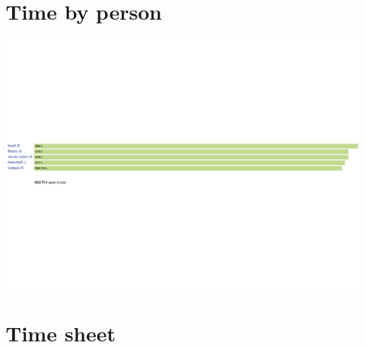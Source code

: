 \documentclass[12pt]{article}
\begin{document}
	\section{Time by person}
		\hspace*{0.20\paperheight}
		\includegraphics[width=1.25\textwidth,angle=90]{timebyperson}
		\clearpage
	
	\section{Time sheet}
		
\end{document}
